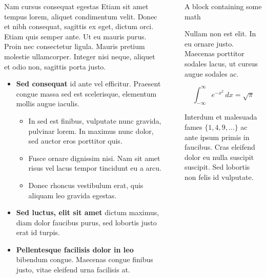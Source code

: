 \documentclass[final]{beamer}
\newlength{\sepwidth}
\newlength{\colwidth}
\newcommand{\separatorcolumn}{\begin{column}{\sepwidth}\end{column}}
\begin{document}
\begin{frame}[t]
\begin{columns}[t]
\begin{column}{\colwidth}
\begin{block}{Nam cursus consequat egestas}
    Etiam sit amet tempus lorem, aliquet condimentum velit. Donec et nibh
    consequat, sagittis ex eget, dictum orci. Etiam quis semper ante. Ut eu
    mauris purus. Proin nec consectetur ligula. Mauris pretium molestie
    ullamcorper. Integer nisi neque, aliquet et odio non, sagittis porta justo.

    \begin{itemize}
      \item \textbf{Sed consequat} id ante vel efficitur. Praesent congue massa
        sed est scelerisque, elementum mollis augue iaculis.
        \begin{itemize}
          \item In sed est finibus, vulputate
            nunc gravida, pulvinar lorem. In maximus nunc dolor, sed auctor eros
            porttitor quis.
          \item Fusce ornare dignissim nisi. Nam sit amet risus vel lacus
            tempor tincidunt eu a arcu.
          \item Donec rhoncus vestibulum erat, quis aliquam leo
            gravida egestas.
        \end{itemize}
      \item \textbf{Sed luctus, elit sit amet} dictum maximus, diam dolor
        faucibus purus, sed lobortis justo erat id turpis.
      \item \textbf{Pellentesque facilisis dolor in leo} bibendum congue.
        Maecenas congue finibus justo, vitae eleifend urna facilisis at.
    \end{itemize}

  \end{block}

\end{column}

\separatorcolumn

\begin{column}{\colwidth}

  \begin{block}{A block containing some math}

    Nullam non est elit. In eu ornare justo. Maecenas porttitor sodales lacus,
    ut cursus augue sodales ac.

    $$
    \int_{-\infty}^{\infty} e^{-x^2}\,dx = \sqrt{\pi}
    $$

    Interdum et malesuada fames $\{1, 4, 9, \ldots\}$ ac ante ipsum primis in
    faucibus. Cras eleifend dolor eu nulla suscipit suscipit. Sed lobortis non
    felis id vulputate.


\end{block}
\end{column}
\end{columns}
\end{frame}
\end{document}
